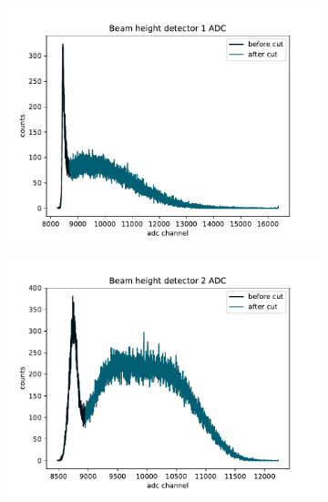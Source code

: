 \begin{figure}
\centering
\begin{subfigure}{.5\textwidth}
  \centering
  \includegraphics[width=\textwidth]{figures/2021_beam_det_1_adc.pdf}
  \caption{}\label{subfig:beam_det_1_adc}
\end{subfigure}%
\begin{subfigure}{.5\textwidth}
  \centering
  \includegraphics[width=\textwidth]{figures/2021_beam_det_2_adc.pdf}
  \caption{}\label{subfig:beam_det_2_adc}
\end{subfigure}
\begin{subfigure}{.5\textwidth}
  \centering

\end{subfigure}
\end{figure}
